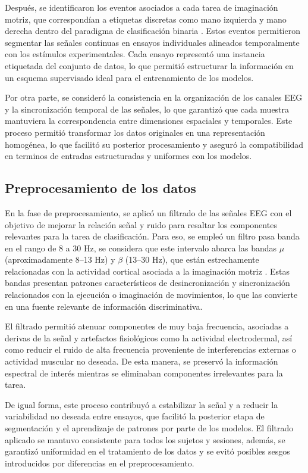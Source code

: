 Después, se identificaron los eventos asociados a cada tarea de imaginación motriz, que correspondían a etiquetas discretas como mano izquierda y mano derecha dentro del paradigma de clasificación binaria . Estos eventos permitieron segmentar las señales continuas en ensayos individuales alineados temporalmente con los estímulos experimentales. Cada ensayo representó una instancia etiquetada del conjunto de datos, lo que permitió estructurar la información en un esquema supervisado ideal para el entrenamiento de los modelos.

Por otra parte, se consideró la consistencia en la organización de los canales EEG y la sincronización temporal de las señales, lo que garantizó que cada muestra mantuviera la correspondencia entre dimensiones espaciales y temporales. Este proceso permitió transformar los datos originales en una representación homogénea, lo que facilitó su posterior procesamiento y aseguró la compatibilidad en terminos de entradas estructuradas y uniformes con los modelos.

\subsection{Preprocesamiento de los datos}

En la fase de preprocesamiento, se aplicó un filtrado de las señales EEG con el objetivo de mejorar la relación señal y ruido para resaltar los componentes relevantes para la tarea de clasificación. Para eso, se empleó un filtro pasa banda en el rango de 8 a 30 Hz, se considera que este intervalo abarca las bandas $\mu$ (aproximadamente 8–13 Hz) y $\beta$ (13–30 Hz), que están estrechamente relacionadas con la actividad cortical asociada a la imaginación motriz \cite{pfurtscheller2001motor, zhang2021eeg}. Estas bandas presentan patrones característicos de desincronización y sincronización relacionados con la ejecución o imaginación de movimientos, lo que las convierte en una fuente relevante de información discriminativa.

El filtrado permitió atenuar componentes de muy baja frecuencia, asociadas a derivas de la señal y artefactos fisiológicos como la actividad electrodermal, así como reducir el ruido de alta frecuencia proveniente de interferencias externas o actividad muscular no deseada. De esta manera, se preservó la información espectral de interés mientras se eliminaban componentes irrelevantes para la tarea.

De igual forma, este proceso contribuyó a estabilizar la señal y a reducir la variabilidad no deseada entre ensayos, que facilitó la posterior etapa de segmentación y el aprendizaje de patrones por parte de los modelos. El filtrado aplicado se mantuvo consistente para todos los sujetos y sesiones, además, se garantizó uniformidad en el tratamiento de los datos y se evitó posibles sesgos introducidos por diferencias en el preprocesamiento. 

